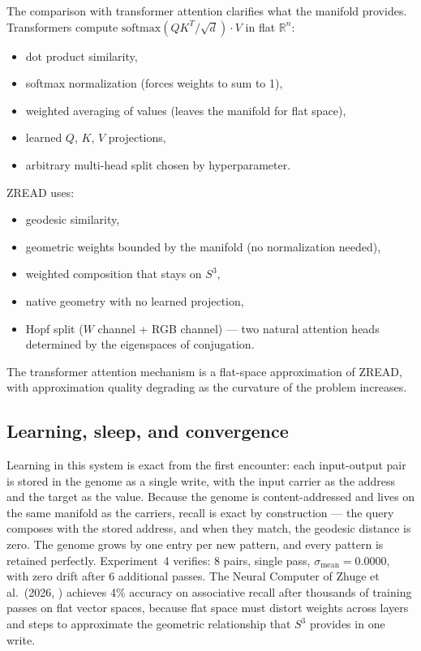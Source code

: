 \documentclass[12pt,a4paper]{article}
\theoremstyle{definition}
\theoremstyle{remark}
\begin{document}
The comparison with transformer attention clarifies what the manifold
provides. Transformers compute $\mathrm{softmax}(QK^T/\sqrt{d}) \cdot V$
in flat $\mathbb{R}^n$:
\begin{itemize}
  \item dot product similarity,
  \item softmax normalization (forces weights to sum to 1),
  \item weighted averaging of values (leaves the manifold for flat space),
  \item learned $Q$, $K$, $V$ projections,
  \item arbitrary multi-head split chosen by hyperparameter.
\end{itemize}
ZREAD uses:
\begin{itemize}
  \item geodesic similarity,
  \item geometric weights bounded by the manifold (no normalization needed),
  \item weighted composition that stays on $S^3$,
  \item native geometry with no learned projection,
  \item Hopf split ($W$ channel + RGB channel) --- two natural attention heads determined by the eigenspaces of conjugation.
\end{itemize}
The transformer attention mechanism is a flat-space approximation of ZREAD,
with approximation quality degrading as the curvature of the problem increases.

\subsection{Learning, sleep, and convergence}

Learning in this system is exact from the first encounter: each input-output
pair is stored in the genome as a single write, with the input carrier as the
address and the target as the value. Because the genome is content-addressed
and lives on the same manifold as the carriers, recall is exact by
construction --- the query composes with the stored address, and when they
match, the geodesic distance is zero. The genome grows by one entry per new
pattern, and every pattern is retained perfectly. Experiment~4 verifies:
8 pairs, single pass, $\sigma_\mathrm{mean} = 0.0000$, with zero drift after
6 additional passes. The Neural Computer of Zhuge et al.\ (2026, \cite{zhuge2026}) achieves 4\%
accuracy on associative recall after thousands of training passes on flat
vector spaces, because flat space must distort weights across layers and steps
to approximate the geometric relationship that $S^3$ provides in one write.
\end{document}
